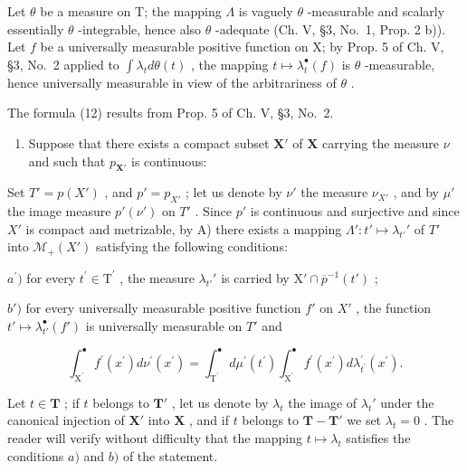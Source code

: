 Let \(\theta\) be a measure on T; the mapping \(\Lambda\) is vaguely \(\theta\) -measurable and scalarly essentially \(\theta\) -integrable, hence also \(\theta\) -adequate (Ch. V, §3, No.~1, Prop. 2 b)). Let \(f\) be a universally measurable positive function on X; by Prop. 5 of Ch. V, §3, No.~2 applied to \(\int \lambda_t d\theta(t)\) , the mapping \(t \mapsto \lambda_t^{\bullet}(f)\) is \(\theta\) -measurable, hence universally measurable in view of the arbitrariness of \(\theta\) .

The formula (12) results from Prop. 5 of Ch. V, §3, No.~2.

\begin{enumerate}
\def\labelenumi{\Alph{enumi})}
\setcounter{enumi}{1}
\tightlist
\item
  Suppose that there exists a compact subset \(\mathbf{X}'\) of \(\mathbf{X}\) carrying the measure \(\nu\) and such that \(p_{\mathbf{X}'}\) is continuous:
\end{enumerate}

Set \(T' = p(X')\) , and \(p' = p_{X'}\) ; let us denote by \(\nu'\) the measure \(\nu_{X'}\) , and by \(\mu'\) the image measure \(p'(\nu')\) on \(T'\) . Since \(p'\) is continuous and surjective and since \(X'\) is compact and metrizable, by A) there exists a mapping \(\Lambda': t' \mapsto \lambda_{t'}'\) of \(T'\) into \(\mathcal{M}_{+}(X')\) satisfying the following conditions:

\(a^{\prime})\) for every \(t^\prime \in \mathrm{T}^\prime\) , the measure \(\lambda_{t'}'\) is carried by \(\mathrm{X}' \cap \overline{p}^{-1}(t')\) ;

\(b')\) for every universally measurable positive function \(f'\) on \(X'\) , the function \(t' \mapsto \lambda_{t'}^{\bullet}(f')\) is universally measurable on \(T'\) and

\[
\int_ {\mathrm{X} ^ {\prime}} ^ {\bullet} f ^ {\prime} (x ^ {\prime}) d \nu^ {\prime} (x ^ {\prime}) = \int_ {\mathrm{T} ^ {\prime}} ^ {\bullet} d \mu^ {\prime} (t ^ {\prime}) \int_ {\mathrm{X} ^ {\prime}} ^ {\bullet} f ^ {\prime} (x ^ {\prime}) d \lambda_ {t ^ {\prime}} ^ {\prime} (x ^ {\prime}).
\]

Let \(t \in \mathbf{T}\) ; if \(t\) belongs to \(\mathbf{T}'\) , let us denote by \(\lambda_t\) the image of \(\lambda_t'\) under the canonical injection of \(\mathbf{X}'\) into \(\mathbf{X}\) , and if \(t\) belongs to \(\mathbf{T} - \mathbf{T}'\) we set \(\lambda_t = 0\) . The reader will verify without difficulty that the mapping \(t \mapsto \lambda_t\) satisfies the conditions \(a)\) and \(b)\) of the statement.

